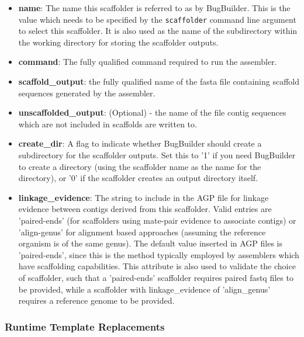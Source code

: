 \documentclass[a4paper,10pt]{article}
\begin{document}
\begin{itemize}
\item {\bf name}: The name this scaffolder is referred to as by BugBuilder. This is the value which
needs to be specified by the {\tt scaffolder} command line argument to select this scaffolder. It is
also used as the name of the subdirectory within the working directory for storing the scaffolder 
outputs.
\item {\bf command}: The fully qualified command required to run the assembler. 
\item {\bf scaffold\_output}:  the fully qualified name of the fasta file containing
scaffold sequences generated by the assembler.
\item {\bf unscaffolded\_output}: (Optional) - the name of the file contig sequences which are not
included in scaffolds are written to. 
\item {\bf create\_dir}: A flag to indicate whether BugBuilder should create a subdirectory for the
scaffolder outputs. Set this to '1' if you need BugBuilder to create a directory (using the
scaffolder name as the name for the directory), or '0' if the scaffolder creates an output
directory itself. 
\item {\bf linkage\_evidence}: The string to include in the AGP file for linkage evidence between
contigs derived from this scaffolder. Valid entries are 'paired-ends' (for scaffolders using
mate-pair evidence to associate contigs) or 'align-genus' for alignment based approaches (assuming
the reference organism is of the same genus). The default value inserted in AGP files is
'paired-ends', since this is the method typically employed by assemblers which have scaffolding
capabilities. This attribute is also used to validate the choice of scaffolder, such that a
'paired-ends' scaffolder requires paired fastq files to be provided, while a scaffolder with
linkage\_evidence of 'align\_genus' requires a reference genome to be provided.  \end{itemize}

\subsubsection{Runtime Template Replacements}
\end{document}
